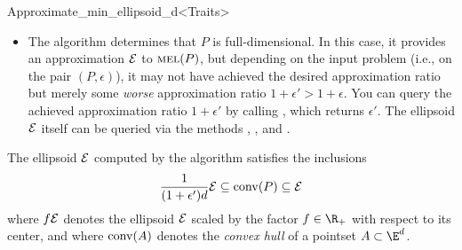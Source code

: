 \begin{ccRefClass}{Approximate_min_ellipsoid_d<Traits>}
\begin{itemize}
  \emph{Important note:} due to rounding errors, the algorithm cannot
  in all cases decide correctly whether $P$ is full-dimensional or
  not.  If  returns , the points
  lie in such a ``thin'' subspace of $\E^d$ that the algorithm is
  incapable of computing an approximation to $\mel(P)$.  More
  precisely, if  returns , there
  exist two parallel hyperplanes in $\E^d$ with the points $P$ in
  between so that the distance $\delta$ between the hyperplanes is
  very small, possible zero. (If $\delta=0$ then $P$ is not
  full-dimensional.)

  If $P$ is not full-dimensional, you might want to use linear algebra
  techniques to determine an affine subspace $S$ of $\E^d$ that
  contains the points $P$ as a (w.r.t.\ $S$) full-dimensional
  pointset; once you have isolated $S$, you can invoke the algorithm
  again to compute an approximation to (the lower-dimensional)
  $\mel(P)$ in $S$.  Since  might (due to
  rounding errors, see above) return  even though $P$ is
  full-dimensional, the lower-dimensional subspace $S$ containing $P$
  need not exist.  Therefore, it might be more adivsable to fit a
  hyperplane $H$ through the pointset $P$, project $P$ onto this
  affine subspace $H$, and compute an approximation to the
  minimum-volume enclosing ellipsoid of the projected points within
  $H$; the fitting can be done for instance using the
   function from the \cgal package
  .
\item The algorithm determines that $P$ is full-dimensional.  In this
  case, it provides an approximation ${\cal E}$ to $\mel(P)$, but
  depending on the input problem (i.e., on the pair $(P,\epsilon)$),
  it may not have achieved the desired approximation ratio but merely
  some \emph{worse} approximation ratio $1+\epsilon'>1+\epsilon$.  You
  can query the achieved approximation ratio $1+\epsilon'$ by calling
  , which returns $\epsilon'$. The ellipsoid
  ${\cal E}$ itself can be queried via the methods
  , , and
  .
\end{itemize}

The ellipsoid ${\cal E}$ computed by the algorithm satisfies the inclusions
\begin{equation}
  \label{eq:approximate_min_ellipsoid_incl}
\frac{1}{(1+\epsilon')d} {\cal E} \subseteq \mathop{\rm
conv}\nolimits(P) \subseteq {\cal E}
\end{equation}
where $f {\cal E}$ denotes the ellipsoid ${\cal E}$ scaled by the
factor $f\in\R_+$ with respect to its center, and where $\mathop{\rm
conv}\nolimits(A)$ denotes the \emph{convex hull} of a pointset
$A\subset \E^d$.


\end{ccRefClass}
